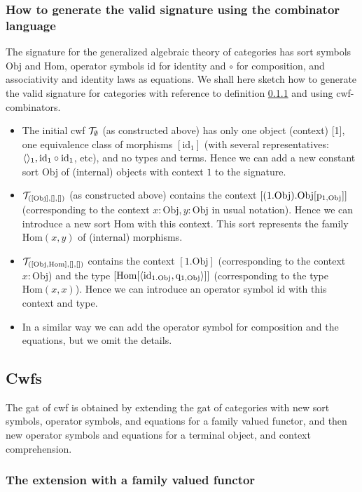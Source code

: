 \documentclass{lmcs}
\def\Obj{\mathrm{Obj}}
\def\Hom{\mathrm{Hom}}
\def\id{\mathrm{id}}
\begin{document}
\subsubsection{How to generate the valid signature using the combinator language} 
The signature for the generalized algebraic theory of categories has sort symbols $\Obj$ 
and $\Hom$, operator symbols $\id$ for identity and $\circ$ for composition, and associativity and identity laws as equations. We shall here sketch how to generate the valid signature for categories with reference to definition \ref{} and using cwf-combinators.
\begin{itemize}
\item The initial cwf ${\mathcal T}_\emptyset$ (as constructed above) has only one object (context) [1], one equivalence class of morphisms $[\id_1]$ (with several representatives: $\tuple{}_1, \id_1 \circ \id_1$, etc), and no types and terms. Hence we can add a new constant sort $\Obj$ of (internal) objects with context $1$ to the signature. 
\item $\T_{([\Obj],[],[])}$ (as constructed above) contains the context $[(1.\Obj).\Obj[\p_{1,\Obj}]]$ (corresponding to the context $x : \Obj, y : \Obj$ in usual notation). Hence we can introduce a new sort $\Hom$ with this context. This sort represents the family $\Hom(x,y)$ of (internal) morphisms.
\item $\T_{([\Obj, \Hom],[],[])}$ contains the context $[1.\Obj]$ (corresponding to the context $x : \Obj$) and the type $[\Hom[\tuple{\id_{1.\Obj},\q_{1,\Obj}}]]$ (corresponding to the type $\Hom(x,x)$). Hence we can introduce an operator symbol $\id$ with this context and type.
\item In a similar way we can add the operator symbol for composition and the equations, but we omit the details.
\end{itemize}

\subsection{Cwfs}

The gat of cwf is obtained by extending the gat of categories with new sort symbols, operator symbols, and equations for a family valued functor, and then new operator symbols and equations for a terminal object, and context comprehension.

\subsubsection{The extension with a family valued functor}
\mbox{ }
\end{document}
